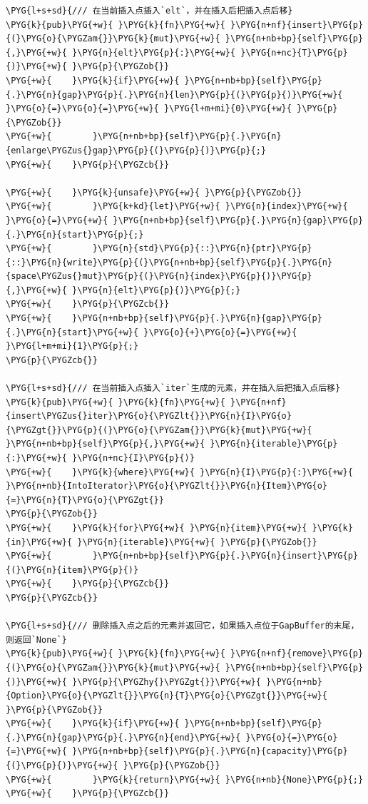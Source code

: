 \begin{Verbatim}[commandchars=\\\{\},breaklines=true,breakanywhere=true,fontsize=\codefont,xleftmargin=17bp]
\PYG{l+s+sd}{/// 在当前插入点插入`elt`，并在插入后把插入点后移}
\PYG{k}{pub}\PYG{+w}{ }\PYG{k}{fn}\PYG{+w}{ }\PYG{n+nf}{insert}\PYG{p}{(}\PYG{o}{\PYGZam{}}\PYG{k}{mut}\PYG{+w}{ }\PYG{n+nb+bp}{self}\PYG{p}{,}\PYG{+w}{ }\PYG{n}{elt}\PYG{p}{:}\PYG{+w}{ }\PYG{n+nc}{T}\PYG{p}{)}\PYG{+w}{ }\PYG{p}{\PYGZob{}}
\PYG{+w}{    }\PYG{k}{if}\PYG{+w}{ }\PYG{n+nb+bp}{self}\PYG{p}{.}\PYG{n}{gap}\PYG{p}{.}\PYG{n}{len}\PYG{p}{(}\PYG{p}{)}\PYG{+w}{ }\PYG{o}{=}\PYG{o}{=}\PYG{+w}{ }\PYG{l+m+mi}{0}\PYG{+w}{ }\PYG{p}{\PYGZob{}}
\PYG{+w}{        }\PYG{n+nb+bp}{self}\PYG{p}{.}\PYG{n}{enlarge\PYGZus{}gap}\PYG{p}{(}\PYG{p}{)}\PYG{p}{;}
\PYG{+w}{    }\PYG{p}{\PYGZcb{}}

\PYG{+w}{    }\PYG{k}{unsafe}\PYG{+w}{ }\PYG{p}{\PYGZob{}}
\PYG{+w}{        }\PYG{k+kd}{let}\PYG{+w}{ }\PYG{n}{index}\PYG{+w}{ }\PYG{o}{=}\PYG{+w}{ }\PYG{n+nb+bp}{self}\PYG{p}{.}\PYG{n}{gap}\PYG{p}{.}\PYG{n}{start}\PYG{p}{;}
\PYG{+w}{        }\PYG{n}{std}\PYG{p}{::}\PYG{n}{ptr}\PYG{p}{::}\PYG{n}{write}\PYG{p}{(}\PYG{n+nb+bp}{self}\PYG{p}{.}\PYG{n}{space\PYGZus{}mut}\PYG{p}{(}\PYG{n}{index}\PYG{p}{)}\PYG{p}{,}\PYG{+w}{ }\PYG{n}{elt}\PYG{p}{)}\PYG{p}{;}
\PYG{+w}{    }\PYG{p}{\PYGZcb{}}
\PYG{+w}{    }\PYG{n+nb+bp}{self}\PYG{p}{.}\PYG{n}{gap}\PYG{p}{.}\PYG{n}{start}\PYG{+w}{ }\PYG{o}{+}\PYG{o}{=}\PYG{+w}{ }\PYG{l+m+mi}{1}\PYG{p}{;}
\PYG{p}{\PYGZcb{}}

\PYG{l+s+sd}{/// 在当前插入点插入`iter`生成的元素，并在插入后把插入点后移}
\PYG{k}{pub}\PYG{+w}{ }\PYG{k}{fn}\PYG{+w}{ }\PYG{n+nf}{insert\PYGZus{}iter}\PYG{o}{\PYGZlt{}}\PYG{n}{I}\PYG{o}{\PYGZgt{}}\PYG{p}{(}\PYG{o}{\PYGZam{}}\PYG{k}{mut}\PYG{+w}{ }\PYG{n+nb+bp}{self}\PYG{p}{,}\PYG{+w}{ }\PYG{n}{iterable}\PYG{p}{:}\PYG{+w}{ }\PYG{n+nc}{I}\PYG{p}{)}
\PYG{+w}{    }\PYG{k}{where}\PYG{+w}{ }\PYG{n}{I}\PYG{p}{:}\PYG{+w}{ }\PYG{n+nb}{IntoIterator}\PYG{o}{\PYGZlt{}}\PYG{n}{Item}\PYG{o}{=}\PYG{n}{T}\PYG{o}{\PYGZgt{}}
\PYG{p}{\PYGZob{}}
\PYG{+w}{    }\PYG{k}{for}\PYG{+w}{ }\PYG{n}{item}\PYG{+w}{ }\PYG{k}{in}\PYG{+w}{ }\PYG{n}{iterable}\PYG{+w}{ }\PYG{p}{\PYGZob{}}
\PYG{+w}{        }\PYG{n+nb+bp}{self}\PYG{p}{.}\PYG{n}{insert}\PYG{p}{(}\PYG{n}{item}\PYG{p}{)}
\PYG{+w}{    }\PYG{p}{\PYGZcb{}}
\PYG{p}{\PYGZcb{}}

\PYG{l+s+sd}{/// 删除插入点之后的元素并返回它，如果插入点位于GapBuffer的末尾，则返回`None`}
\PYG{k}{pub}\PYG{+w}{ }\PYG{k}{fn}\PYG{+w}{ }\PYG{n+nf}{remove}\PYG{p}{(}\PYG{o}{\PYGZam{}}\PYG{k}{mut}\PYG{+w}{ }\PYG{n+nb+bp}{self}\PYG{p}{)}\PYG{+w}{ }\PYG{p}{\PYGZhy{}\PYGZgt{}}\PYG{+w}{ }\PYG{n+nb}{Option}\PYG{o}{\PYGZlt{}}\PYG{n}{T}\PYG{o}{\PYGZgt{}}\PYG{+w}{ }\PYG{p}{\PYGZob{}}
\PYG{+w}{    }\PYG{k}{if}\PYG{+w}{ }\PYG{n+nb+bp}{self}\PYG{p}{.}\PYG{n}{gap}\PYG{p}{.}\PYG{n}{end}\PYG{+w}{ }\PYG{o}{=}\PYG{o}{=}\PYG{+w}{ }\PYG{n+nb+bp}{self}\PYG{p}{.}\PYG{n}{capacity}\PYG{p}{(}\PYG{p}{)}\PYG{+w}{ }\PYG{p}{\PYGZob{}}
\PYG{+w}{        }\PYG{k}{return}\PYG{+w}{ }\PYG{n+nb}{None}\PYG{p}{;}
\PYG{+w}{    }\PYG{p}{\PYGZcb{}}


\end{Verbatim}
